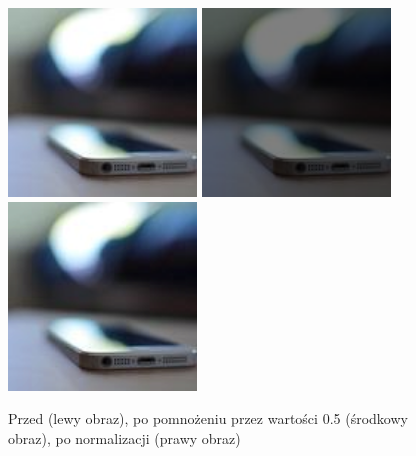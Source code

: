\documentclass[a4paper,12pt]{book}
\begin{document}
\begin{figure}[H]
	\caption{Przed (lewy obraz), po pomnożeniu przez wartości 0.5 (środkowy obraz), po normalizacji (prawy obraz)}
	\includegraphics[width=5cm, height=5cm]{phone-unmodified.jpg}
	\includegraphics[width=5cm, height=5cm]{3-2/multiply-color-const-phone-5.png}
	\includegraphics[width=5cm, height=5cm]{3-2/multiply-color-const-phone-5-norm.png}
\end{figure}
\end{document}
